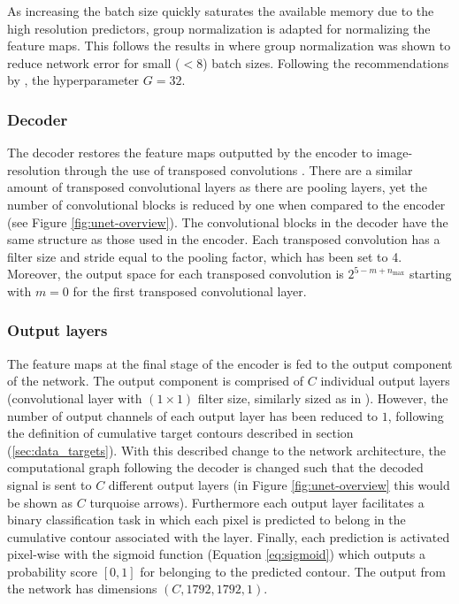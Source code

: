 \documentclass[../main/thesis]{subfiles}
\begin{document}
As increasing the batch size quickly saturates the available memory due to the high resolution predictors, group normalization is adapted for normalizing the feature maps. This follows the results in \citet{Wu2018} where group normalization was shown to reduce network error for small ($<8$) batch sizes. Following the recommendations by \citet{Wu2018}, the hyperparameter $G=32$. 

\subsubsection{Decoder}
The decoder restores the feature maps outputted by the encoder to image-resolution through the use of transposed convolutions \citep{Zeiler2010}. There are a similar amount of transposed convolutional layers as there are pooling layers, yet the number of convolutional blocks is reduced by one when compared to the encoder (see Figure \ref{fig:unet-overview}). The convolutional blocks in the decoder have the same structure as those used in the encoder. Each transposed convolution has a filter size and stride equal to the pooling factor, which has been set to 4. Moreover, the output space for each transposed convolution is $2^{5 - m + n_{\text{max}}}$ starting with $m = 0$ for the first transposed convolutional layer.

\subsubsection{Output layers}
\label{sec:architecture-output}
The feature maps at the final stage of the encoder is fed to the output component of the network. The output component is comprised of $C$ individual output layers (convolutional layer with $(1 \times 1)$ filter size, similarly sized as in \citet{Ronneberger2015}). However, the number of output channels of each output layer has been reduced to $1$, following the definition of cumulative target contours described in section (\ref{sec:data_targets}). With this described change to the network architecture, the computational graph following the decoder is changed such that the decoded signal is sent to $C$ different output layers (in Figure \ref{fig:unet-overview} this would be shown as $C$ turquoise arrows). Furthermore each output layer facilitates a binary classification task in which each pixel is predicted to belong in the cumulative contour associated with the layer. Finally, each prediction is activated pixel-wise with the sigmoid function (Equation \ref{eq:sigmoid}) which outputs a probability score $\left[0, 1\right]$ for belonging to the predicted contour. The output from the network has dimensions $(C, 1792, 1792, 1)$.
\end{document}
